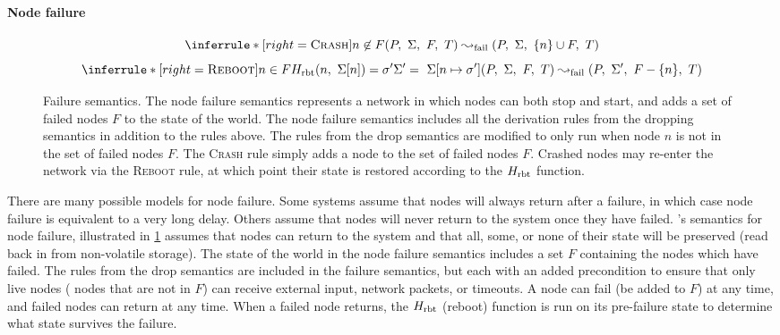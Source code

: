 \paragraph{Node failure}

\begin{figure}[t]
  \centering

  \begin{footnotesize} \begin{spacing}{1.5} \[
    \inferrule*[right=\textsc{Crash}]{
      n \not\in F
    }{
      (P,\ \Sigma,\ F,\ T) \ffailstep (P,\ \Sigma,\ \{n\} \cup F,\ T)
    }
  \]\[
    \inferrule*[right=\textsc{Reboot}]{
      n \in F \\
      \fHrbt(n,\ \Sigma[n]) = \sigma' \\
      \Sigma' =\ \Sigma[n \mapsto \sigma'] \\
    }{
      (P,\ \Sigma,\ F,\ T) \ffailstep (P,\ \Sigma',\ F - \{n\},\ T)
    }
  \] \end{spacing} \end{footnotesize}

  \caption{Failure semantics.
    The node failure semantics represents a network in which nodes can both
    stop and start, and adds a set of failed nodes $F$ to the state of the
    world.
    The node failure semantics includes all the derivation rules from the
    dropping semantics in addition to the rules above.
    The rules from the drop semantics are modified to only run when node
    $n$ is not in the set of failed nodes $F$.
    The \textsc{Crash} rule simply adds a node to the set of failed nodes
    $F$.
    Crashed nodes may re-enter the network via the \textsc{Reboot} rule, at
  which point their state is restored according to the $H_{\mathrm{rbt}}$ function.}

\label{fig:failure-semantics}
\end{figure}

There are many possible models for node failure.
%
Some systems assume that nodes will always return after a failure, in which
case node failure is equivalent to a very long delay.
%
Others assume that nodes will never return to the system once they have
failed.
%
\Verdi's semantics for node failure, illustrated in
\cref{fig:failure-semantics} assumes that nodes can return to the system
and that all, some, or none of their state will be preserved (\ie read back
in from non-volatile storage).
%
The state of the world in the node failure semantics includes a set $F$
containing the nodes which have failed.
%
The rules from the drop semantics are included in the failure semantics,
but each with an added precondition to ensure that only live nodes (\ie
nodes that are not in $F$) can receive external input, network packets, or
timeouts.
%
A node can fail (be added to $F$) at any time, and failed nodes can return
at any time.
%
When a failed node returns, the $H_{\mathrm{rbt}}$ (reboot) function is run on its
pre-failure state to determine what state survives the failure.

